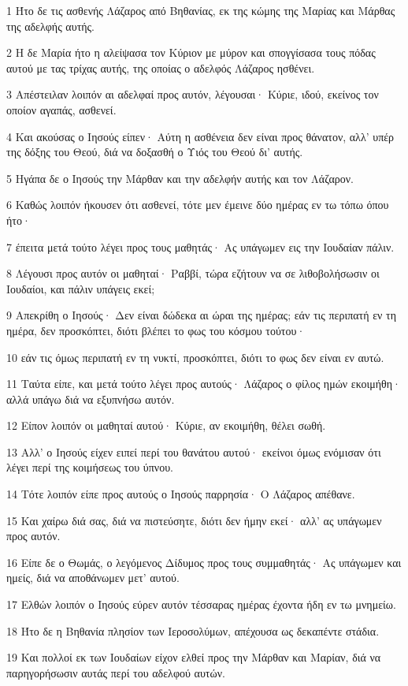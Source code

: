 \par 1 Ήτο δε τις ασθενής Λάζαρος από Βηθανίας, εκ της κώμης της Μαρίας και Μάρθας της αδελφής αυτής.
\par 2 Η δε Μαρία ήτο η αλείψασα τον Κύριον με μύρον και σπογγίσασα τους πόδας αυτού με τας τρίχας αυτής, της οποίας ο αδελφός Λάζαρος ησθένει.
\par 3 Απέστειλαν λοιπόν αι αδελφαί προς αυτόν, λέγουσαι· Κύριε, ιδού, εκείνος τον οποίον αγαπάς, ασθενεί.
\par 4 Και ακούσας ο Ιησούς είπεν· Αύτη η ασθένεια δεν είναι προς θάνατον, αλλ' υπέρ της δόξης του Θεού, διά να δοξασθή ο Υιός του Θεού δι' αυτής.
\par 5 Ηγάπα δε ο Ιησούς την Μάρθαν και την αδελφήν αυτής και τον Λάζαρον.
\par 6 Καθώς λοιπόν ήκουσεν ότι ασθενεί, τότε μεν έμεινε δύο ημέρας εν τω τόπω όπου ήτο·
\par 7 έπειτα μετά τούτο λέγει προς τους μαθητάς· Ας υπάγωμεν εις την Ιουδαίαν πάλιν.
\par 8 Λέγουσι προς αυτόν οι μαθηταί· Ραββί, τώρα εζήτουν να σε λιθοβολήσωσιν οι Ιουδαίοι, και πάλιν υπάγεις εκεί;
\par 9 Απεκρίθη ο Ιησούς· Δεν είναι δώδεκα αι ώραι της ημέρας; εάν τις περιπατή εν τη ημέρα, δεν προσκόπτει, διότι βλέπει το φως του κόσμου τούτου·
\par 10 εάν τις όμως περιπατή εν τη νυκτί, προσκόπτει, διότι το φως δεν είναι εν αυτώ.
\par 11 Ταύτα είπε, και μετά τούτο λέγει προς αυτούς· Λάζαρος ο φίλος ημών εκοιμήθη· αλλά υπάγω διά να εξυπνήσω αυτόν.
\par 12 Είπον λοιπόν οι μαθηταί αυτού· Κύριε, αν εκοιμήθη, θέλει σωθή.
\par 13 Αλλ' ο Ιησούς είχεν ειπεί περί του θανάτου αυτού· εκείνοι όμως ενόμισαν ότι λέγει περί της κοιμήσεως του ύπνου.
\par 14 Τότε λοιπόν είπε προς αυτούς ο Ιησούς παρρησία· Ο Λάζαρος απέθανε.
\par 15 Και χαίρω διά σας, διά να πιστεύσητε, διότι δεν ήμην εκεί· αλλ' ας υπάγωμεν προς αυτόν.
\par 16 Είπε δε ο Θωμάς, ο λεγόμενος Δίδυμος προς τους συμμαθητάς· Ας υπάγωμεν και ημείς, διά να αποθάνωμεν μετ' αυτού.
\par 17 Ελθών λοιπόν ο Ιησούς εύρεν αυτόν τέσσαρας ημέρας έχοντα ήδη εν τω μνημείω.
\par 18 Ήτο δε η Βηθανία πλησίον των Ιεροσολύμων, απέχουσα ως δεκαπέντε στάδια.
\par 19 Και πολλοί εκ των Ιουδαίων είχον ελθεί προς την Μάρθαν και Μαρίαν, διά να παρηγορήσωσιν αυτάς περί του αδελφού αυτών.
